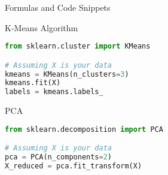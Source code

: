 \documentclass[aspectratio=169]{beamer}
\begin{document}
\begin{frame}{Formulas and Code Snippets}
    \begin{block}{K-Means Algorithm}
    \begin{lstlisting}[language=Python]
from sklearn.cluster import KMeans

# Assuming X is your data
kmeans = KMeans(n_clusters=3)
kmeans.fit(X)
labels = kmeans.labels_
    \end{lstlisting}
    \end{block}

    \begin{block}{PCA}
    \begin{lstlisting}[language=Python]
from sklearn.decomposition import PCA

# Assuming X is your data
pca = PCA(n_components=2)
X_reduced = pca.fit_transform(X)
    \end{lstlisting}
    \end{block}
\end{frame}
\end{document}
